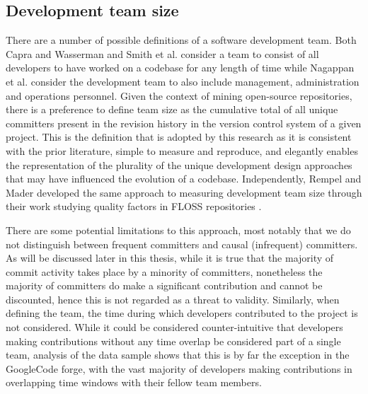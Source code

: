 \subsection{Development team size}
There are a number of possible definitions of a software development team. Both Capra and Wasserman and Smith et al. consider a team to consist of all developers to have worked on a codebase for any length of time \citep{smith2001empirical, capra2008framework} while Nagappan et al. \citep{nagappan2008influence} consider the development team to also include management, administration and operations personnel. Given the context of mining open-source repositories, there is a preference to define team size as the cumulative total of all unique committers present in the revision history in the version control system of a given project. This is the definition that is adopted by this research as it is consistent with the prior literature, simple to measure and reproduce, and elegantly enables the representation of the plurality of the unique development design approaches that may have influenced the evolution of a codebase. Independently, Rempel and Mader developed the same approach to measuring development team size through their work studying quality factors in FLOSS repositories \citep{rempel2017preventing}.

There are some potential limitations to this approach, most notably that we do not distinguish between frequent committers and causal (infrequent) committers. As will be discussed later in this thesis, while it is true that the majority of commit activity takes place by a minority of committers, nonetheless the majority of committers do make a significant contribution and cannot be discounted, hence this is not regarded as a threat to validity. Similarly, when defining the team, the time during which developers contributed to the project is not considered. While it could be considered counter-intuitive that developers making contributions without any time overlap be considered part of a single team, analysis of the data sample shows that this is by far the exception in the GoogleCode forge, with the vast majority of developers making contributions in overlapping time windows with their fellow team members.

